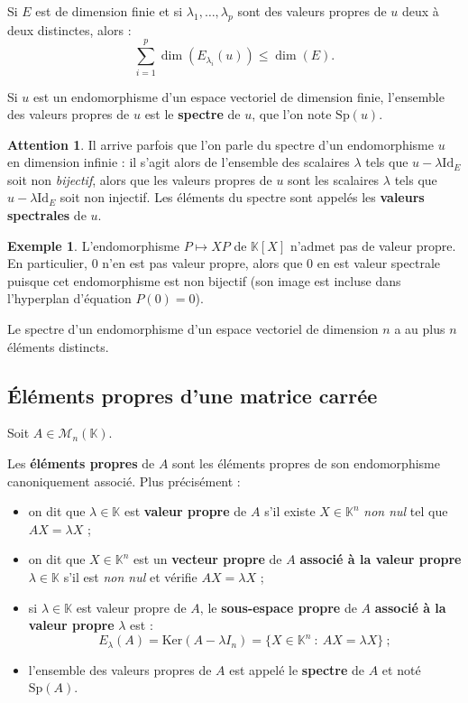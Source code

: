 \documentclass[french]{article}
\newcommand{\K}{\mathbb{K}}
\renewcommand{\ker}{\text{Ker}}
\newcommand{\Id}{\text{Id}}
\newcommand{\Sp}{\text{Sp}}
\theoremstyle{plain}
\theoremstyle{definition}
\newtheorem*{ex}{Exemple}
\newtheorem*{attention}{Attention}
\theoremstyle{remark}
\begin{document}
	\begin{cor}%
		Si $E$ est de dimension finie et si $\lambda_1,\ldots,\lambda_p$ sont des valeurs propres de $u$ deux à deux distinctes, alors : $$\sum_{i=1}^{p}\dim(E_{\lambda_i}(u))\leqslant\dim(E).$$
	\end{cor}
	
	\begin{dfn}
		Si $u$ est un endomorphisme d'un espace vectoriel de dimension finie, l'ensemble des valeurs propres de $u$ est le \textbf{spectre} de $u$, que l'on note $\Sp(u)$.
	\end{dfn}
	
	\begin{attention}
		Il arrive parfois que l'on parle du spectre d'un endomorphisme $u$ en dimension infinie : il s'agit alors de l'ensemble des scalaires $\lambda$ tels que $u-\lambda\Id_E$ soit non \textit{bijectif}, alors que les valeurs propres de $u$ sont les scalaires $\lambda$ tels que $u-\lambda\Id_E$ soit non injectif. Les éléments du spectre sont appelés les \textbf{valeurs spectrales} de $u$.
	\end{attention}
	
	\begin{ex}
		L'endomorphisme $P\mapsto XP$ de $\K[X]$ n'admet pas de valeur propre. En particulier, $0$ n'en est pas valeur propre, alors que $0$ en est valeur spectrale puisque cet endomorphisme est non bijectif (son image est incluse dans l'hyperplan d'équation $P(0)=0$).
	\end{ex}
	
	\begin{cor}%
		Le spectre d'un endomorphisme d'un espace vectoriel de dimension $n$ a au plus $n$ éléments distincts.
	\end{cor}
	
	\subsection{Éléments propres d'une matrice carrée}
	
	Soit $A\in\mathcal{M}_n(\K)$.
	
	\begin{dfn}
		Les \textbf{éléments propres} de $A$ sont les éléments propres de son endomorphisme canoniquement associé. Plus précisément :
		\begin{itemize}
			\item on dit que $\lambda\in\K$ est \textbf{valeur propre} de $A$ s'il existe $X\in\K^n$ \textit{non nul} tel que $AX=\lambda X$ ;
			\item on dit que $X\in\K^n$ est un \textbf{vecteur propre} de $A$ \textbf{associé à la valeur propre} $\lambda\in\K$ s'il est \textit{non nul} et vérifie $AX=\lambda X$ ;
			\item si $\lambda\in\K$ est valeur propre de $A$, le \textbf{sous-espace propre} de $A$ \textbf{associé à la valeur propre} $\lambda$ est :
			$$E_\lambda(A)=\ker(A-\lambda I_n)=\{X\in\K^n\ :\ AX=\lambda X\}\ ;$$
			\item l'ensemble des valeurs propres de $A$ est appelé le \textbf{spectre} de $A$ et noté $\Sp(A)$.
		\end{itemize}
	\end{dfn}
	
\end{document}
